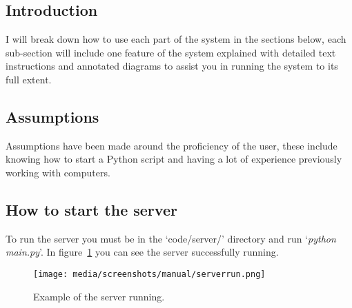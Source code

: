 \documentclass[12pt,a4paper]{report}
\begin{document}
    \subsection{Introduction}
        I will break down how to use each part of the system in the sections below, each sub-section will include one feature of
        the system explained with detailed text instructions and annotated diagrams to assist you in running the system to its full extent.

    \subsection{Assumptions}
        Assumptions have been made around the proficiency of the user, these include knowing how to start a Python script and having a lot of
        experience previously working with computers.

    \subsection{How to start the server}
        To run the server you must be in the `code/server/' directory and run `\textit{python main.py}'. In figure~\ref{fig:serverrun} you can 
        see the server successfully running.
        \begin{figure}[H]
            \centering
            \caption{Example of the server running.}
            \label{fig:serverrun}
                \texttt{[image: media/screenshots/manual/serverrun.png]}
        \end{figure}
\end{document}
